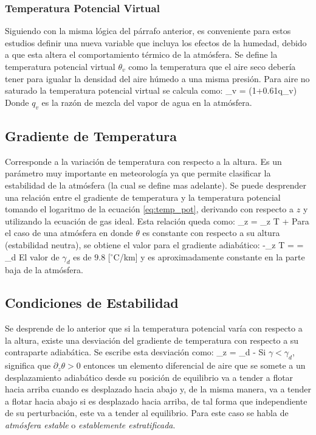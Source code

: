 \subsubsection{Temperatura Potencial Virtual}
Siguiendo con la misma lógica del párrafo anterior, es conveniente para estos estudios definir una nueva variable que incluya los efectos de la humedad, debido a que esta altera el comportamiento térmico de la atmósfera. Se define la temperatura potencial virtual $\theta_v$ como la temperatura que el aire seco debería tener para igualar la densidad del aire húmedo a una misma presión. Para aire no saturado la temperatura potencial virtual se calcula como:
\be 
\theta_v = \theta(1+0.61q_v)
\ee
Donde $q_v$ es la razón de mezcla del vapor de agua en la atmósfera.
\subsection{Gradiente de Temperatura}
Corresponde a la variación de temperatura con respecto a la altura. Es un parámetro muy importante en meteorología ya que permite clasificar la estabilidad de la atmósfera (la cual se define mas adelante). Se puede desprender una relación entre el gradiente de temperatura y la temperatura potencial tomando el logaritmo de la ecuación \ref{eq:temp_pot}, derivando con respecto a $z$ y utilizando la ecuación de gas ideal. Esta relación queda como:
\be 
{}\partial_z \theta = \partial_z T +
\ee
Para el caso de una atmósfera en donde $\theta$ es constante con respecto a su altura (estabilidad neutra), se obtiene el valor para el gradiente adiabático:
\be 
-\partial_z T = = \gamma_d
\ee
El valor de $\gamma_d$ es de $9.8$ [$^\circ$C/km] y es aproximadamente constante en la parte baja de la atmósfera.
\subsection{Condiciones de Estabilidad}
Se desprende de lo anterior que si la temperatura potencial varía con respecto a la altura, existe una desviación del gradiente de temperatura con respecto a su contraparte adiabática. Se escribe esta desviación como:
\be 
{}\partial_z \theta = \gamma_d - \gamma
\ee
Si $\gamma<\gamma_d$, significa que $\partial_z \theta>0$ entonces un elemento diferencial de aire que se somete a un desplazamiento adiabático desde su posición de equilibrio va a tender a flotar hacia arriba cuando es desplazado hacia abajo y, de la misma manera, va a tender a flotar hacia abajo si es desplazado hacia arriba, de tal forma que independiente de su perturbación, este va a tender al equilibrio. Para este caso se habla de \emph{atmósfera estable} o \emph{establemente estratificada}.

